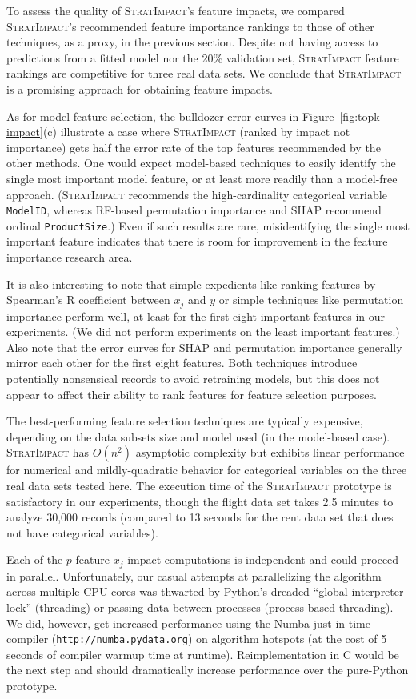 \documentclass[11pt]{article}
\newcommand{\figref}[1]{Figure~\ref{#1}}
\newcommand{\simp}{\fontfamily{cmr}\textsc{\small StratImpact}}
\begin{document}
To assess the quality of \simp's feature impacts, we compared \simp's recommended feature importance rankings to those of other techniques, as a proxy, in the previous section. Despite not having access to predictions from a fitted model nor the 20\% validation set, \simp{} feature rankings are competitive for three real data sets. We conclude that \simp{} is a promising approach for obtaining feature impacts.  

As for model feature selection, the bulldozer error curves in \figref{fig:topk-impact}(c) illustrate a case where \simp{} (ranked by impact not importance) gets half the error rate of the top features recommended by the other methods.  One would expect model-based techniques to easily identify the single most important model feature, or at least more readily than a model-free approach.  (\simp{} recommends the high-cardinality categorical variable {\tt ModelID}, whereas RF-based permutation importance and SHAP recommend ordinal {\tt ProductSize}.)  Even if such results are rare, misidentifying the single most important feature indicates that there is room for improvement in the feature importance research area. 

It is also interesting to note that simple expedients like ranking features by Spearman's R coefficient between $x_j$ and $y$ or simple techniques like permutation importance perform well, at least for the first eight important features in our experiments. (We did not perform experiments on the least important features.) Also note that the error curves for SHAP and permutation importance generally mirror each other for the first eight features.  Both techniques introduce potentially nonsensical records to avoid retraining models, but this does not appear to affect their ability to rank features for feature selection purposes.

The best-performing feature selection techniques are typically expensive, depending on the data subsets size and model used (in the model-based case).  \simp{} has $O(n^2)$ asymptotic complexity but exhibits linear performance for numerical and mildly-quadratic behavior for categorical variables on the three real data sets tested here.  The execution time of the \simp{} prototype is satisfactory in our experiments, though the flight data set takes 2.5 minutes to analyze 30,000 records (compared to 13 seconds for the rent data set that does not have categorical variables).

Each of the $p$ feature $x_j$ impact computations is independent and could proceed in parallel. Unfortunately, our casual attempts at parallelizing the algorithm across multiple CPU cores was thwarted by Python's dreaded ``global interpreter lock'' (threading) or passing data between processes (process-based threading).  We did, however, get increased performance using the Numba just-in-time compiler ({\tt\small http://numba.pydata.org}) on algorithm hotspots (at the cost of 5 seconds of compiler warmup time at runtime). Reimplementation in C would be the next step and should dramatically increase performance over the pure-Python prototype.
\end{document}
